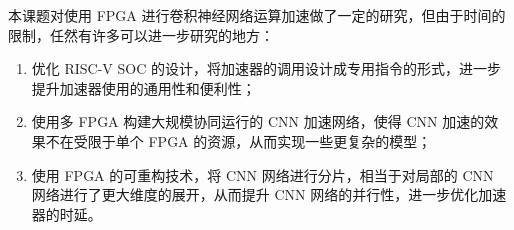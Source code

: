本课题对使用 FPGA 进行卷积神经网络运算加速做了一定的研究，但由于时间的限制，任然有许多可以进一步研究的地方：

\begin{enumerate}
    \item 优化 RISC-V SOC 的设计，将加速器的调用设计成专用指令的形式，进一步提升加速器使用的通用性和便利性；

    \item 使用多 FPGA 构建大规模协同运行的 CNN 加速网络，使得 CNN 加速的效果不在受限于单个 FPGA 的资源，从而实现一些更复杂的模型；

    \item 使用 FPGA 的可重构技术，将 CNN 网络进行分片，相当于对局部的 CNN 网络进行了更大维度的展开，从而提升 CNN 网络的并行性，进一步优化加速器的时延。
\end{enumerate}